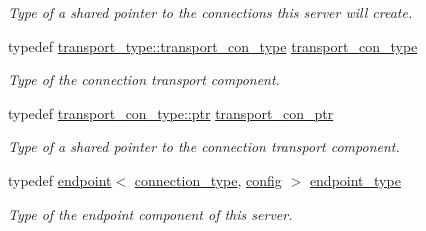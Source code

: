 \begin{DoxyCompactItemize}
\begin{DoxyCompactList}\small\item\em Type of a shared pointer to the connections this server will create. \end{DoxyCompactList}\item 
typedef \hyperlink{classwebsocketpp_1_1transport_1_1asio_1_1endpoint_a75f3102766fd3ba8230e99a2b0e00457}{transport\+\_\+type\+::transport\+\_\+con\+\_\+type} \hyperlink{classwebsocketpp_1_1server_a0515060720d024fb5d0ee7db1b4498a6}{transport\+\_\+con\+\_\+type}\hypertarget{classwebsocketpp_1_1server_a0515060720d024fb5d0ee7db1b4498a6}{}\label{classwebsocketpp_1_1server_a0515060720d024fb5d0ee7db1b4498a6}

\begin{DoxyCompactList}\small\item\em Type of the connection transport component. \end{DoxyCompactList}\item 
typedef \hyperlink{classwebsocketpp_1_1transport_1_1asio_1_1connection_aa6f25556860a154c4dacb4dac1dce8e4}{transport\+\_\+con\+\_\+type\+::ptr} \hyperlink{classwebsocketpp_1_1server_af23763a1899c4636299f59f130570aab}{transport\+\_\+con\+\_\+ptr}\hypertarget{classwebsocketpp_1_1server_af23763a1899c4636299f59f130570aab}{}\label{classwebsocketpp_1_1server_af23763a1899c4636299f59f130570aab}

\begin{DoxyCompactList}\small\item\em Type of a shared pointer to the connection transport component. \end{DoxyCompactList}\item 
typedef \hyperlink{classwebsocketpp_1_1endpoint}{endpoint}$<$ \hyperlink{classwebsocketpp_1_1server_a82d3d94b70a49b2073c9b3378ec7047c}{connection\+\_\+type}, \hyperlink{classconfig}{config} $>$ \hyperlink{classwebsocketpp_1_1server_a40f4d4bb132daf5164ccc290e9dbceb7}{endpoint\+\_\+type}\hypertarget{classwebsocketpp_1_1server_a40f4d4bb132daf5164ccc290e9dbceb7}{}\label{classwebsocketpp_1_1server_a40f4d4bb132daf5164ccc290e9dbceb7}

\begin{DoxyCompactList}\small\item\em Type of the endpoint component of this server. \end{DoxyCompactList}\end{DoxyCompactItemize}
